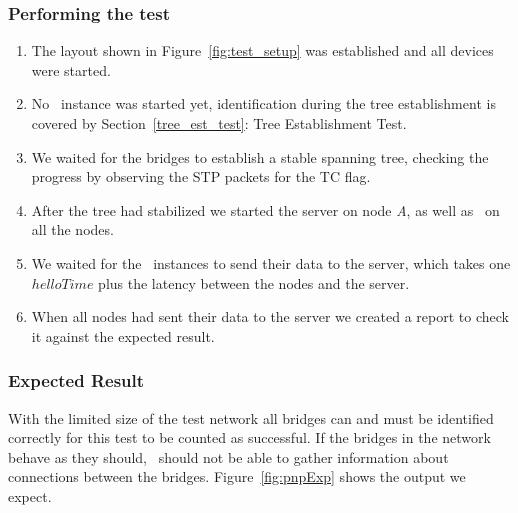 \subsubsection*{Performing the test}
\begin{enumerate}
    \item The layout shown in Figure~\ref{fig:test_setup} was established and all devices were started.
    \item No \tool\ instance was started yet, identification during the tree establishment is covered by Section~\ref{tree_est_test}: Tree Establishment Test.
    \item We waited for the bridges to establish a stable spanning tree, checking the progress by observing the STP packets for the TC flag.
    \item After the tree had stabilized we started the server on node \textit{A}, as well as \tool\ on all the nodes.
    \item We waited for the \tool\ instances to send their data to the server, which takes one $helloTime$ plus the latency between the nodes and the server.
    \item When all nodes had sent their data to the server we created a report to check it against the expected result.
\end{enumerate}
\subsubsection*{Expected Result}
With the limited size of the test network all bridges can and must be identified correctly for this test to be counted as successful.
If the bridges in the network behave as they should, \tool\ should not be able to gather information about connections between the bridges.
Figure~\ref{fig:pnpExp} shows the output we expect.

